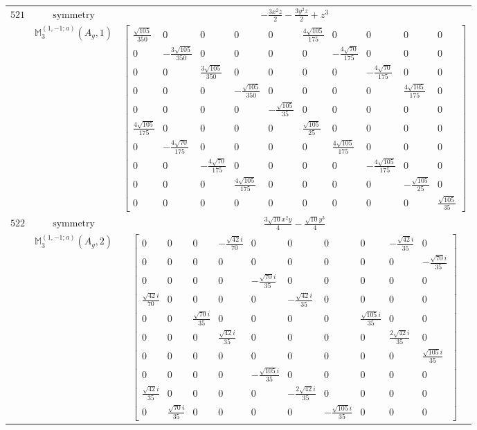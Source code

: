 \documentclass[fleqn,8pt,landscape]{jsarticle}
\begin{document}
\begin{longtable}{ccc}
$ 521 $ & $ \text{symmetry} $ & $ - \frac{3 x^{2} z}{2} - \frac{3 y^{2} z}{2} + z^{3} $ \\
$  $ & $ \mathbb{M}_{3}^{(1,-1;a)}(A_{g},1) $ & $ \begin{bmatrix} \frac{\sqrt{105}}{350} & 0 & 0 & 0 & 0 & \frac{4 \sqrt{105}}{175} & 0 & 0 & 0 & 0 \\ 0 & - \frac{3 \sqrt{105}}{350} & 0 & 0 & 0 & 0 & - \frac{4 \sqrt{70}}{175} & 0 & 0 & 0 \\ 0 & 0 & \frac{3 \sqrt{105}}{350} & 0 & 0 & 0 & 0 & - \frac{4 \sqrt{70}}{175} & 0 & 0 \\ 0 & 0 & 0 & - \frac{\sqrt{105}}{350} & 0 & 0 & 0 & 0 & \frac{4 \sqrt{105}}{175} & 0 \\ 0 & 0 & 0 & 0 & - \frac{\sqrt{105}}{35} & 0 & 0 & 0 & 0 & 0 \\ \frac{4 \sqrt{105}}{175} & 0 & 0 & 0 & 0 & \frac{\sqrt{105}}{25} & 0 & 0 & 0 & 0 \\ 0 & - \frac{4 \sqrt{70}}{175} & 0 & 0 & 0 & 0 & \frac{4 \sqrt{105}}{175} & 0 & 0 & 0 \\ 0 & 0 & - \frac{4 \sqrt{70}}{175} & 0 & 0 & 0 & 0 & - \frac{4 \sqrt{105}}{175} & 0 & 0 \\ 0 & 0 & 0 & \frac{4 \sqrt{105}}{175} & 0 & 0 & 0 & 0 & - \frac{\sqrt{105}}{25} & 0 \\ 0 & 0 & 0 & 0 & 0 & 0 & 0 & 0 & 0 & \frac{\sqrt{105}}{35} \end{bmatrix} $ \\ \hline
$ 522 $ & $ \text{symmetry} $ & $ \frac{3 \sqrt{10} x^{2} y}{4} - \frac{\sqrt{10} y^{3}}{4} $ \\
$  $ & $ \mathbb{M}_{3}^{(1,-1;a)}(A_{g},2) $ & $ \begin{bmatrix} 0 & 0 & 0 & - \frac{\sqrt{42} i}{70} & 0 & 0 & 0 & 0 & - \frac{\sqrt{42} i}{35} & 0 \\ 0 & 0 & 0 & 0 & 0 & 0 & 0 & 0 & 0 & - \frac{\sqrt{70} i}{35} \\ 0 & 0 & 0 & 0 & - \frac{\sqrt{70} i}{35} & 0 & 0 & 0 & 0 & 0 \\ \frac{\sqrt{42} i}{70} & 0 & 0 & 0 & 0 & - \frac{\sqrt{42} i}{35} & 0 & 0 & 0 & 0 \\ 0 & 0 & \frac{\sqrt{70} i}{35} & 0 & 0 & 0 & 0 & \frac{\sqrt{105} i}{35} & 0 & 0 \\ 0 & 0 & 0 & \frac{\sqrt{42} i}{35} & 0 & 0 & 0 & 0 & \frac{2 \sqrt{42} i}{35} & 0 \\ 0 & 0 & 0 & 0 & 0 & 0 & 0 & 0 & 0 & \frac{\sqrt{105} i}{35} \\ 0 & 0 & 0 & 0 & - \frac{\sqrt{105} i}{35} & 0 & 0 & 0 & 0 & 0 \\ \frac{\sqrt{42} i}{35} & 0 & 0 & 0 & 0 & - \frac{2 \sqrt{42} i}{35} & 0 & 0 & 0 & 0 \\ 0 & \frac{\sqrt{70} i}{35} & 0 & 0 & 0 & 0 & - \frac{\sqrt{105} i}{35} & 0 & 0 & 0 \end{bmatrix} $ \\ \hline

\end{longtable}
\end{document}
